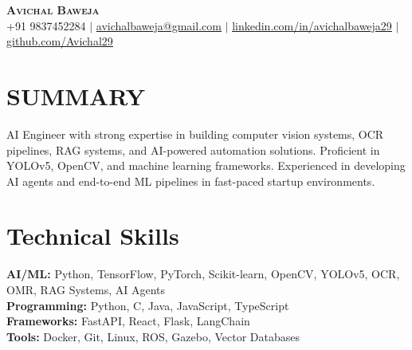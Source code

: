 \documentclass[letterpaper,10pt]{article}
\begin{document}
\begin{center}
    \textbf{\Huge \scshape Avichal Baweja} \\ \vspace{1pt}
    \small +91 9837452284 $|$ \href{mailto:avichalbaweja@gmail.com}{\underline{avichalbaweja@gmail.com}} $|$
    \href{https://www.linkedin.com/in/avichalbaweja29/}{\underline{linkedin.com/in/avichalbaweja29}} $|$
    \href{https://github.com/avichal29}{\underline{github.com/Avichal29}}
\end{center}

\section{SUMMARY}
AI Engineer with strong expertise in building computer vision systems, OCR pipelines, RAG systems, and AI-powered automation solutions. Proficient in YOLOv5, OpenCV, and machine learning frameworks. Experienced in developing AI agents and end-to-end ML pipelines in fast-paced startup environments.

\section{Technical Skills}
\begin{itemize}[leftmargin=0.2in, label={}]
    \small{\item{
    \textbf{AI/ML:} Python, TensorFlow, PyTorch, Scikit-learn, OpenCV, YOLOv5, OCR, OMR, RAG Systems, AI Agents \\
    \textbf{Programming:} Python, C, Java, JavaScript, TypeScript \\
    \textbf{Frameworks:} FastAPI, React, Flask, LangChain \\
    \textbf{Tools:} Docker, Git, Linux, ROS, Gazebo, Vector Databases \\
    }}
\end{itemize}
\end{document}
